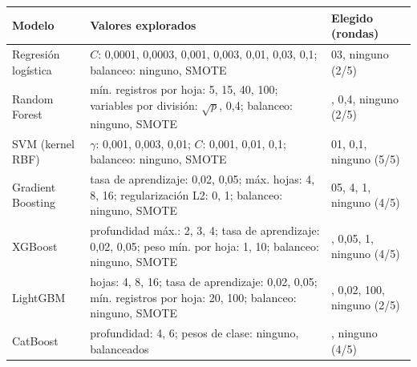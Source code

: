 \begin{tabular}{>{\raggedright\arraybackslash}p{2.4cm}>{\raggedright\arraybackslash}p{8.2cm}>{\raggedright\arraybackslash}p{3.6cm}}
\toprule
Modelo & Valores explorados & Elegido (rondas) \\
\midrule
Regresión logística & $C$: 0{,}0001, 0{,}0003, 0{,}001, 0{,}003, 0{,}01, 0{,}03, 0{,}1; balanceo: ninguno, SMOTE & 0{,}03, ninguno (2/5) \\
Random Forest & mín. registros por hoja: 5, 15, 40, 100; variables por división: $\sqrt{p}$, 0{,}4; balanceo: ninguno, SMOTE & 15, 0{,}4, ninguno (2/5) \\
SVM (kernel RBF) & $\gamma$: 0{,}001, 0{,}003, 0{,}01; $C$: 0{,}001, 0{,}01, 0{,}1; balanceo: ninguno, SMOTE & 0{,}01, 0{,}1, ninguno (5/5) \\
Gradient Boosting & tasa de aprendizaje: 0{,}02, 0{,}05; máx. hojas: 4, 8, 16; regularización L2: 0, 1; balanceo: ninguno, SMOTE & 0{,}05, 4, 1, ninguno (4/5) \\
XGBoost & profundidad máx.: 2, 3, 4; tasa de aprendizaje: 0{,}02, 0{,}05; peso mín. por hoja: 1, 10; balanceo: ninguno, SMOTE & 2, 0{,}05, 1, ninguno (4/5) \\
LightGBM & hojas: 4, 8, 16; tasa de aprendizaje: 0{,}02, 0{,}05; mín. registros por hoja: 20, 100; balanceo: ninguno, SMOTE & 4, 0{,}02, 100, ninguno (2/5) \\
CatBoost & profundidad: 4, 6; pesos de clase: ninguno, balanceados & 4, ninguno (4/5) \\
\bottomrule
\end{tabular}
